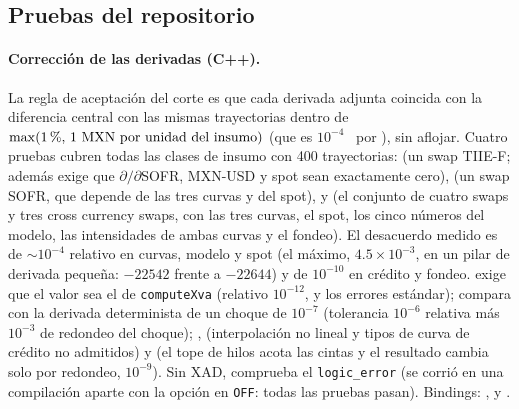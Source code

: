 \begin{sloppypar}
\subsection{Pruebas del repositorio}\label{sec:cap16-pruebas}

\paragraph{Corrección de las derivadas (C++).} La regla de aceptación del corte es que cada derivada adjunta
coincida con la diferencia central con las mismas trayectorias dentro de $\max(1\,\%,\,1\text{ \MXN\ por unidad del insumo})$
(que es $10^{-4}$ \MXN\ por \pb), sin aflojar. Cuatro pruebas cubren todas las clases de insumo con 400 trayectorias:
 (un swap TIIE-F; además exige que $\partial/\partial$SOFR,
MXN-USD y spot sean exactamente cero),
 (un swap SOFR, que depende de las tres curvas y del spot),
 y
 (el conjunto de cuatro swaps y tres cross currency
swaps, con las tres curvas, el spot, los cinco números del modelo, las intensidades de ambas curvas y el fondeo). El
desacuerdo medido es de $\sim10^{-4}$ relativo en curvas, modelo y spot (el máximo, $4.5\times10^{-3}$, en un pilar de
derivada pequeña: $-\num{22542}$ frente a $-\num{22644}$) y de $10^{-10}$ en crédito y fondeo.
 exige que el valor sea el de \texttt{computeXva}
(relativo $10^{-12}$, y los errores estándar);
 compara con la derivada determinista
de un choque de $10^{-7}$ (tolerancia $10^{-6}$ relativa más $10^{-3}$ de redondeo del choque);
,
 (interpolación no lineal y tipos de curva de crédito
no admitidos) y  (el tope de hilos
acota las cintas y el resultado cambia solo por redondeo, $10^{-9}$). Sin XAD,
 comprueba el \texttt{logic\_error}
(se corrió en una compilación aparte con la opción en \texttt{OFF}: todas las pruebas pasan). Bindings:
,
 y
.


\end{sloppypar}

